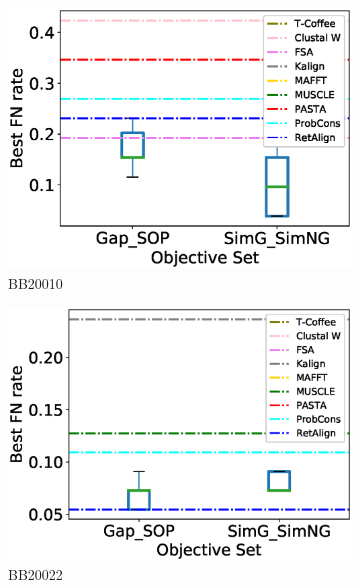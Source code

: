 \begin{figure}[!htbp]
\begin{adjustwidth}{-1.5cm}{-1cm}
\begin{subfigure}{0.22\textwidth}
			\includegraphics[width=\columnwidth]{Figure/summary/precomputedInit/Balibase/BB20010_objset_fnrate_rank}
			\caption{BB20010}
		\end{subfigure}
		\begin{subfigure}{0.22\textwidth}
			\includegraphics[width=\columnwidth]{Figure/summary/precomputedInit/Balibase/BB20022_objset_fnrate_rank}
			\caption{BB20022}
		\end{subfigure}
		\begin{subfigure}{0.22\textwidth}

\end{subfigure}
\end{adjustwidth}
\end{figure}
